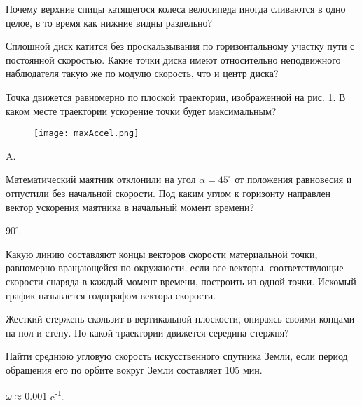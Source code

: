 \begin{ex} 
Почему верхние спицы катящегося колеса велосипеда иногда сливаются в одно целое, в то время как нижние видны раздельно?
\end{ex}

\begin{ex} 
Сплошной диск катится без проскальзывания по горизонтальному участку пути с постоянной скоростью. Какие точки диска имеют относительно неподвижного наблюдателя такую же по модулю скорость, что и центр диска?
\end{ex}

\begin{ex} %
Точка движется равномерно по плоской траектории, изображенной на рис. \ref{maxAccel}. В каком месте траектории ускорение точки будет максимальным?

\begin{figure}[h]
\centering
\texttt{[image: maxAccel.png]}
\caption{}
\label{maxAccel}
\end{figure}
\begin{ans}
A.
\end{ans}
\end{ex}

\begin{ex} %
Математический маятник отклонили на угол $\alpha = 45^{\circ}$ от положения равновесия и отпустили без начальной скорости. Под каким углом к горизонту направлен вектор ускорения маятника в начальный момент времени?
\begin{ans}
$90^{\circ}$.
\end{ans}
\end{ex}

\begin{ex}
Какую линию составляют концы векторов скорости материальной точки, равномерно вращающейся по окружности, если все векторы, соответствующие скорости снаряда в каждый момент времени, построить из одной точки. Искомый график называется годографом вектора скорости.
\end{ex}

\begin{ex}
Жесткий стержень скользит в вертикальной плоскости, опираясь своими концами на пол и стену. По какой траектории движется середина стержня?
\end{ex}

\simpleProblems

\begin{ex} %
Найти среднюю угловую скорость искусственного спутника Земли, если период обращения его по орбите вокруг Земли составляет 105 мин.
\begin{ans}
$\omega \approx 0.001$ c\textsuperscript{-1}.
\end{ans}
\end{ex}

